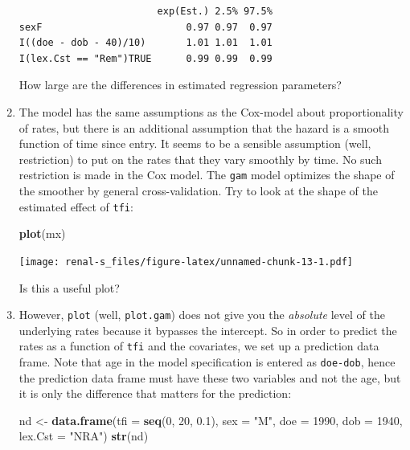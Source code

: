 \documentclass[
]{book}
\newenvironment{Shaded}{\begin{snugshade}}{\end{snugshade}}
\newcommand{\AttributeTok}[1]{\textcolor[rgb]{0.13,0.29,0.53}{#1}}
\newcommand{\DecValTok}[1]{\textcolor[rgb]{0.00,0.00,0.81}{#1}}
\newcommand{\FloatTok}[1]{\textcolor[rgb]{0.00,0.00,0.81}{#1}}
\newcommand{\FunctionTok}[1]{\textcolor[rgb]{0.13,0.29,0.53}{\textbf{#1}}}
\newcommand{\NormalTok}[1]{#1}
\newcommand{\OtherTok}[1]{\textcolor[rgb]{0.56,0.35,0.01}{#1}}
\newcommand{\StringTok}[1]{\textcolor[rgb]{0.31,0.60,0.02}{#1}}
\begin{document}
\begin{enumerate}
\begin{verbatim}
                        exp(Est.) 2.5% 97.5%
sexF                         0.97 0.97  0.97
I((doe - dob - 40)/10)       1.01 1.01  1.01
I(lex.Cst == "Rem")TRUE      0.99 0.99  0.99
\end{verbatim}

  How large are the differences in estimated regression parameters?
\item
  The model has the same assumptions as the Cox-model about
  proportionality of rates, but there is an additional assumption that
  the hazard is a smooth function of time since entry. It seems to be
  a sensible assumption (well, restriction) to put on the rates that
  they vary smoothly by time. No such restriction is made in the Cox
  model. The \texttt{gam} model optimizes the shape of the smoother by
  general cross-validation. Try to look at the shape of the
  estimated effect of \texttt{tfi}:

\begin{Shaded}
\begin{Highlighting}[]
\FunctionTok{plot}\NormalTok{(mx)}
\end{Highlighting}
\end{Shaded}

  \texttt{[image: renal-s\_files/figure-latex/unnamed-chunk-13-1.pdf]}

  Is this a useful plot?
\item
  However, \texttt{plot} (well, \texttt{plot.gam}) does not give you the \emph{absolute}
  level of the underlying rates because it bypasses the intercept. So
  in order to predict the rates as a function of \texttt{tfi} and the
  covariates, we set up a prediction data frame. Note that age
  in the model specification is entered as \texttt{doe-dob}, hence
  the prediction data frame must have these two variables and not
  the age, but it is only the difference that matters for the prediction:

\begin{Shaded}
\begin{Highlighting}[]
\NormalTok{nd }\OtherTok{\textless{}{-}} \FunctionTok{data.frame}\NormalTok{(}\AttributeTok{tfi =} \FunctionTok{seq}\NormalTok{(}\DecValTok{0}\NormalTok{, }\DecValTok{20}\NormalTok{, }\FloatTok{0.1}\NormalTok{),}
                 \AttributeTok{sex =} \StringTok{"M"}\NormalTok{,}
                 \AttributeTok{doe =} \DecValTok{1990}\NormalTok{,}
                 \AttributeTok{dob =} \DecValTok{1940}\NormalTok{,}
             \AttributeTok{lex.Cst =} \StringTok{"NRA"}\NormalTok{)}
\FunctionTok{str}\NormalTok{(nd)}
\end{Highlighting}
\end{Shaded}


\end{enumerate}
\end{document}
